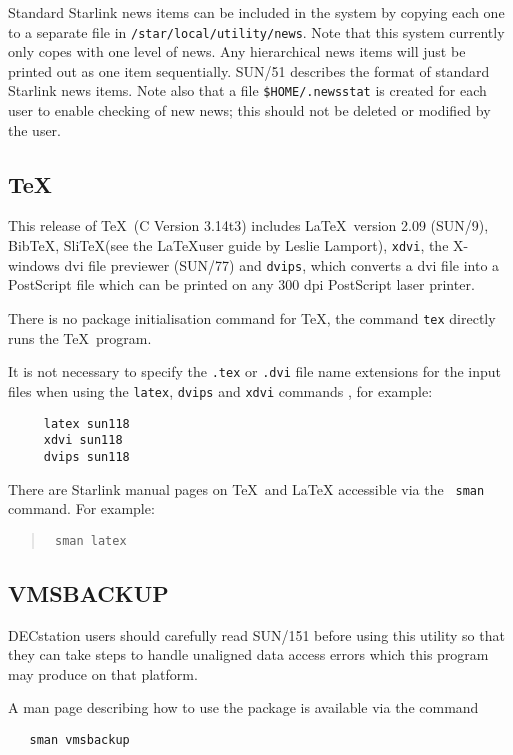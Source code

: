 Standard Starlink news items can be included in the system
by copying each one to a separate file in
{\tt /star/local/utility/news}. Note that this system currently only
copes with one level of news. Any hierarchical news items
will just be printed out as one item sequentially.
SUN/51 describes the format of standard Starlink news items.
Note also that a file {\tt\$HOME/.newsstat} is created for each user to
enable checking of new news; this should not be deleted
or modified by the user.


\subsection{\TeX\ }

This release of \TeX\ (C Version 3.14t3) includes \LaTeX\ version 2.09 (SUN/9),
Bib\TeX, Sli\TeX (see the \LaTeX user guide by Leslie Lamport), {\tt xdvi}, the
X-windows dvi file previewer (SUN/77) and {\tt dvips}, which converts a dvi
file into a PostScript file which can be printed on any 300 dpi PostScript
laser printer.

There is no package initialisation command for \TeX, the command {\tt tex}
directly runs the \TeX\ program.

It is not necessary to specify the {\tt .tex} or {\tt .dvi} file name
extensions for the input files when using the {\tt latex}, {\tt dvips} and
{\tt xdvi} commands , for example:

\begin{verbatim}
     latex sun118
     xdvi sun118
     dvips sun118
\end{verbatim}

There are Starlink manual pages on \TeX\ and {\LaTeX}  accessible via the {\tt
sman} command. For example:
\begin{quote}\tt
sman latex
\end{quote}


\subsection{VMSBACKUP}

DECstation users should carefully read SUN/151 before using this
utility so that they can take steps to handle unaligned data access errors
which this program may produce on that platform.

A man page describing how to use the package is available via the command
\begin{verbatim}
   sman vmsbackup
\end{verbatim}

